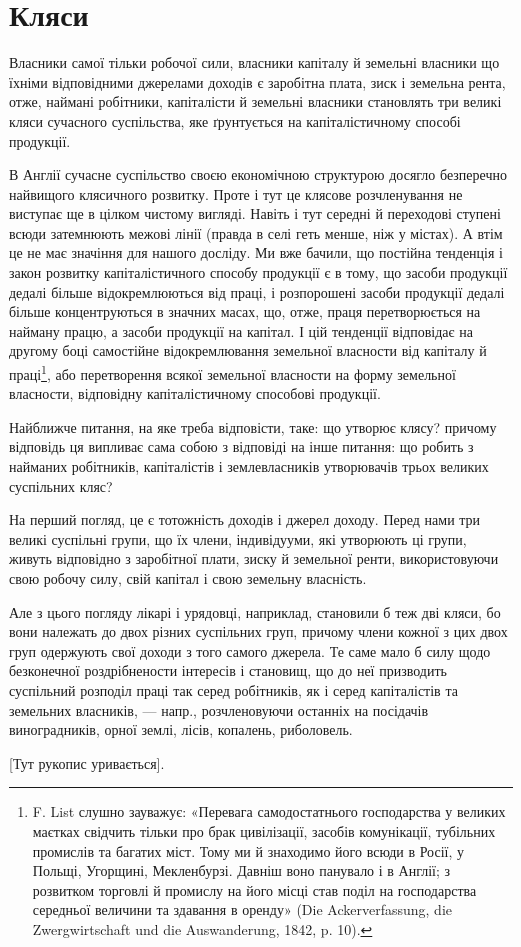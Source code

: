 \section{Кляси}

Власники самої тільки робочої сили, власники капіталу й земельні власники
що їхніми відповідними джерелами доходів є заробітна плата, зиск і земельна рента,
отже, наймані робітники, капіталісти й земельні власники становлять три великі
кляси сучасного суспільства, яке ґрунтується на капіталістичному способі
продукції.

В Англії сучасне суспільство своєю економічною структурою досягло безперечно
найвищого клясичного розвитку. Проте і тут це клясове розчленування не
виступає ще в цілком чистому вигляді. Навіть і тут середні й переходові ступені
всюди затемнюють межові лінії (правда в селі геть менше, ніж у містах).
А втім це не має значіння для нашого досліду. Ми вже бачили, що постійна
тенденція і закон розвитку капіталістичного способу продукції є в тому, що
засоби продукції дедалі більше відокремлюються від праці, і розпорошені засоби
продукції дедалі більше концентруються в значних масах, що, отже, праця
перетворюється на найману працю, а засоби продукції на капітал. І цій тенденції
відповідає на другому боці самостійне відокремлювання земельної власности
від капіталу й праці\footnote{
F. List слушно зауважує: «Перевага самодостатнього господарства у великих маєтках
свідчить тільки про брак цивілізації, засобів комунікації, тубільних промислів та багатих міст. Тому
ми й знаходимо його всюди в Росії, у Польщі, Угорщині, Мекленбурзі. Давніш воно панувало і в Англії;
з розвитком торговлі й промислу на його місці став поділ на господарства середньої величини та
здавання в оренду» (Die Ackerverfassung, die Zwergwirtschaft und die Auswanderung, 1842, p. 10).
}, або перетворення всякої земельної власности на форму
земельної власности, відповідну капіталістичному способові продукції.

Найближче питання, на яке треба відповісти, таке: що утворює клясу?
причому відповідь ця випливає сама собою з відповіді на інше питання: що
робить з найманих робітників, капіталістів і землевласників утворювачів трьох
великих суспільних кляс?

На перший погляд, це є тотожність доходів і джерел доходу. Перед нами
три великі суспільні групи, що їх члени, індивідууми, які утворюють ці групи,
живуть відповідно з заробітної плати, зиску й земельної ренти, використовуючи
свою робочу силу, свій капітал і свою земельну власність.

Але з цього погляду лікарі і урядовці, наприклад, становили б теж дві
кляси, бо вони належать до двох різних суспільних груп, причому члени кожної
з цих двох груп одержують свої доходи з того самого джерела. Те саме мало б
силу щодо безконечної роздрібнености інтересів і становищ, що до неї призводить
суспільний розподіл праці так серед робітників, як і серед капіталістів та
земельних власників, — напр., розчленовуючи останніх на посідачів виноградників,
орної землі, лісів, копалень, риболовель.

\begin{center}
[Тут рукопис уривається].
\end{center}
